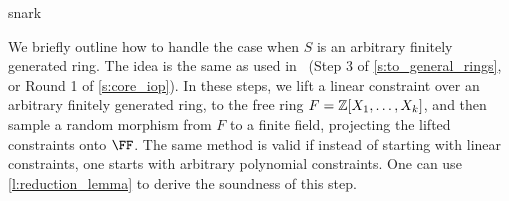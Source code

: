 \begin{lncsappendix}{snark}
\bigskip


\begin{remark}\label{r:arb_fg_ring}\label{s:to_general_bitz}
We briefly outline how to handle the case when $S$ is an arbitrary finitely generated ring. The idea is the same as used in \ftwoz\ (\iflncs\else Step 3 of \cref{s:to_general_rings}, or \fi{}Round 1 of \cref{s:core_iop}). In these steps, we lift a linear constraint over an arbitrary finitely generated ring, to the free ring $F=\mathbb{Z}[X_1, \ldots, X_k]$, and then sample a random morphism from $F$ to a finite field, projecting the lifted constraints onto $\FF$. The same method is valid if instead of starting with linear constraints, one starts with arbitrary polynomial constraints. One can use \cref{l:reduction_lemma} to derive the soundness of this step. 
\end{remark}






\end{lncsappendix}
